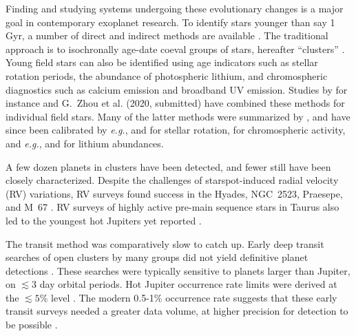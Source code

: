 \documentclass[12pt,twocolumn,tighten]{aastex63}
\begin{document}
Finding and studying systems undergoing these evolutionary changes is
a major goal in contemporary exoplanet research.  To identify stars
younger than say 1$\,$Gyr, a number of direct and indirect methods are
available \citep{soderblom_ages_2010}.  The traditional approach is to
isochronally age-date coeval groups of stars, hereafter ``clusters''
\citep[{\it
e.g.},][]{lada_embedded_2003,zuckerman_young_2004,krumholz_star_2019}.
Young field stars can also be identified using age indicators such as
stellar rotation periods, the abundance of photospheric lithium, and
chromospheric diagnostics such as calcium emission and broadband UV
emission.  Studies by for instance \citet{david_discovery_2018} and
G{.}~Zhou et al. (2020, submitted) have combined these methods for
individual field stars.  Many of the latter methods were summarized by
\citet{mamajek_improved_2008}, and have since been calibrated by {\it
e.g.},
\citet{irwin_rotational_2009,barnes_color-period_2015,meibom_spin-down_2015,angus_calibrating_2015}
and \citet{curtis_tess_2019} for stellar rotation,
\citet{zerjal_chromospherically_2017} for chromospheric activity, and
{\it e.g.}, \citet{elliott_search_2016,berger_identifying_2018} and
\citet{zerjal_galah_2019} for lithium abundances.

A few dozen planets in clusters have been detected, and fewer still
have been closely characterized.  Despite the challenges of
starspot-induced radial velocity (RV) variations, RV surveys found
success in the Hyades, NGC~2523, Praesepe, and M~67
\citep{Sato_et_al_2007,lovis_mayor_2007,Quinn_et_al_2012,Malavolta_et_al_2016,brucalassi_search_2017}.
RV surveys of highly active pre-main sequence stars in Taurus also led
to the youngest hot Jupiters yet reported
\citep{donati_hj_2016,johns-krull_candidate_2016,biddle_k2_2018,flagg_co_2019}.

The transit method was comparatively slow to catch up.  Early deep
transit searches of open clusters by many groups did not yield
definitive planet detections
\citep{mochejska_planets_2005,mochejska_planets_2006,burke_survey_2006,aigrain_monitor_2007,irwin_monitordata_2007,miller_monitor_2008,pepper_photometric_2008,hartman_MMT_IV_2009}.
These searches were typically sensitive to planets larger than
Jupiter, on $\lesssim 3$ day orbital periods.  Hot Jupiter occurrence
rate limits were derived at the $\lesssim 5\%$ level \citep[{\it
e.g.},][]{burke_survey_2006,hartman_MMT_IV_2009}.  The modern 0.5-1\%
occurrence rate suggests that these early transit surveys needed a
greater data volume, at higher precision for detection to be possible
\citep{mayor_harps_2011,wright_frequency_2012,howard_planet_2012,petigura_metallicity_2018}.
\end{document}
